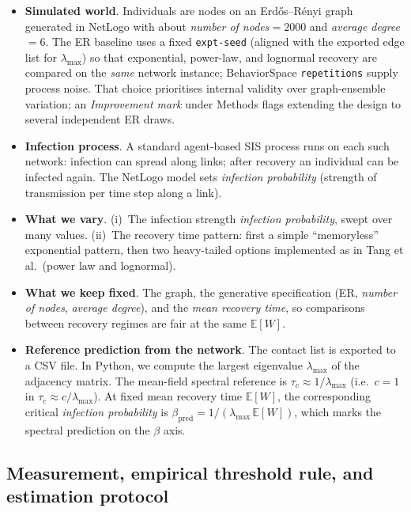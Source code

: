 \documentclass[11pt,a4paper]{article}
\begin{document}
\begin{itemize}[leftmargin=*]
  \item \textbf{Simulated world}. Individuals are nodes on an Erd\H{o}s--R\'enyi graph~\cite{ErdosRenyi1959} generated in NetLogo with about \emph{number of nodes}${}=2000$ and \emph{average degree}${}=6$. The ER baseline uses a fixed \texttt{expt-seed} (aligned with the exported edge list for $\lambda_{\max}$) so that exponential, power-law, and lognormal recovery are compared on the \emph{same} network instance; BehaviorSpace \texttt{repetitions} supply process noise. That choice prioritises internal validity over graph-ensemble variation; an \emph{Improvement mark} under Methods flags extending the design to several independent ER draws.

  \item \textbf{Infection process}. A standard agent-based SIS process runs on each such network: infection can spread along links; after recovery an individual can be infected again. The NetLogo model sets \emph{infection probability} (strength of transmission per time step along a link).

  \item \textbf{What we vary}. (i)~The infection strength \emph{infection probability}, swept over many values. (ii)~The recovery time pattern: first a simple ``memoryless'' exponential pattern, then two heavy-tailed options implemented as in Tang et al.\ (power law and lognormal).

  \item \textbf{What we keep fixed}. The graph, the generative specification (ER, \emph{number of nodes}, \emph{average degree}), and the \emph{mean recovery time}, so comparisons between recovery regimes are fair at the same $\mathbb{E}[W]$.

  \item \textbf{Reference prediction from the network}. The contact list is exported to a CSV file. In Python, we compute the largest eigenvalue $\lambda_{\max}$ of the adjacency matrix. The mean-field spectral reference is $\tau_c \approx 1/\lambda_{\max}$ (i.e.\ $c=1$ in $\tau_c \approx c/\lambda_{\max}$). At fixed mean recovery time $\mathbb{E}[W]$, the corresponding critical \emph{infection probability} is $\beta_{\mathrm{pred}} = 1/(\lambda_{\max}\,\mathbb{E}[W])$, which marks the spectral prediction on the $\beta$ axis.
\end{itemize}

\subsection*{Measurement, empirical threshold rule, and estimation protocol}
\end{document}
